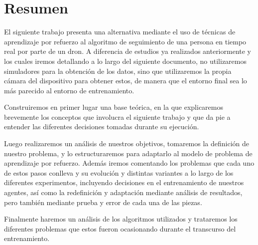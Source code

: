 \cleardoublepage

\chapter*{Resumen}
\label{resumen}

El siguiente trabajo presenta una alternativa mediante el uso de técnicas de aprendizaje por refuerzo al algoritmo de seguimiento de una persona en tiempo real por parte de un dron. A diferencia de estudios ya realizados anteriormente y los cuales iremos detallando a lo largo del siguiente documento, no utilizaremos simuladores para la obtención de los datos, sino que utilizaremos la propia cámara del dispositivo para obtener estos, de manera que el entorno final sea lo más parecido al entorno de entrenamiento.


Construiremos en primer lugar una base teórica, en la que explicaremos brevemente los conceptos que involucra el siguiente trabajo y que da pie a entender las diferentes decisiones tomadas durante su ejecución.


Luego realizaremos un análisis de nuestros objetivos, tomaremos la definición de nuestro problema, y lo estructuraremos para adaptarlo al modelo de problema de aprendizaje por refuerzo. Además iremos comentando los problemas que cada uno de estos pasos conlleva y su evolución y distintas variantes a lo largo de los diferentes experimentos, incluyendo decisiones en el entrenamiento de nuestros agentes, así como la redefinición y adaptación mediante análisis de resultados, pero también mediante prueba y error de cada una de las piezas.


Finalmente haremos un análisis de los algoritmos utilizados y trataremos los diferentes problemas que estos fueron ocasionando durante el transcurso del entrenamiento. 

